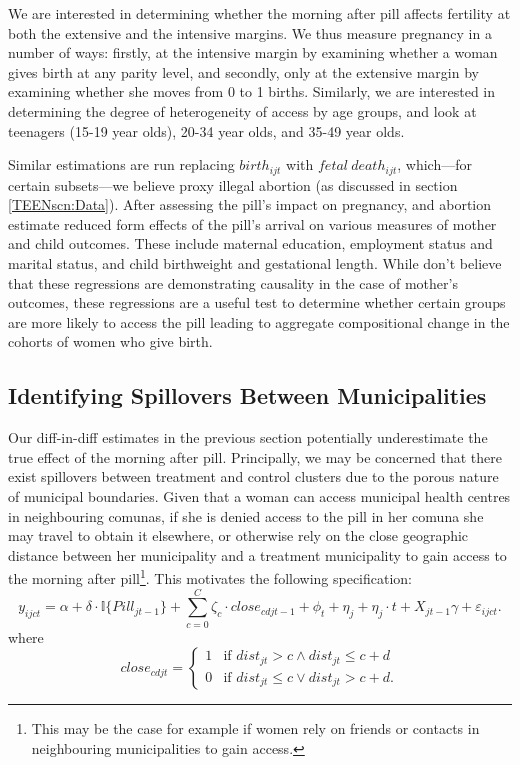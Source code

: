 We are interested in determining whether the morning after pill affects 
fertility at both the extensive and the intensive margins.  We thus measure
pregnancy in a number of ways: firstly, at the intensive margin by examining
whether a woman gives birth at any parity level, and secondly, only at the
extensive margin by examining whether she moves from 0 to 1 births. Similarly, 
we are interested in determining the degree of heterogeneity of access by age 
groups, and look at teenagers (15-19 year olds), 20-34 year olds, and 35-49 
year olds. 

Similar estimations are run replacing $birth_{ijt}$ with $fetal\ death_{ijt}$,
which---for certain subsets---we believe proxy illegal abortion (as discussed
in section \ref{TEENscn:Data}).  After assessing the pill's impact on pregnancy, 
and abortion \person estimate reduced form effects of the pill's arrival on 
various measures of mother and child outcomes.  These include maternal education,
employment status and marital status, and child birthweight and gestational
length.  While \person don't believe that these regressions are demonstrating
causality in the case of mother's outcomes, these regressions are a useful test
to determine whether certain groups are more likely to access the pill leading to
aggregate compositional change in the cohorts of women who give birth.

\subsection{Identifying Spillovers Between Municipalities}
\label{TEENsscn:spilloverID}
Our diff-in-diff estimates in the previous section potentially underestimate the 
true effect of the morning after pill.  Principally, we may be concerned that
there exist spillovers between treatment and control clusters due to the porous
nature of municipal boundaries. Given that a woman can access municipal health
centres in neighbouring comunas, if she is denied access to the pill in her
comuna she may travel to obtain it elsewhere, or otherwise rely on the close
geographic distance between her municipality and a treatment municipality to 
gain access to the morning after pill\footnote{This may be the case for example
if women rely on friends or contacts in neighbouring municipalities to gain 
access.}.  This motivates the following specification:
\begin{equation}
 \label{TEENeqn:spillover}
y_{ijct} = \alpha + \delta\cdot \mathbb{I}\{Pill_{jt-1}\} + 
\sum_{c=0}^C\zeta_c\cdot close_{cdjt-1} + \phi_t + \eta_j + \eta_j\cdot t +
X_{jt-1}\gamma + \varepsilon_{ijct}.
\end{equation}
where
\[
 close_{cdjt} =
  \begin{cases}
   1 & \text{if } dist_{jt} > c \wedge dist_{jt}\leq c+d   \\
   0 & \text{if } dist_{jt} \leq c \vee  dist_{jt}>c+d.
  \end{cases}
\]

